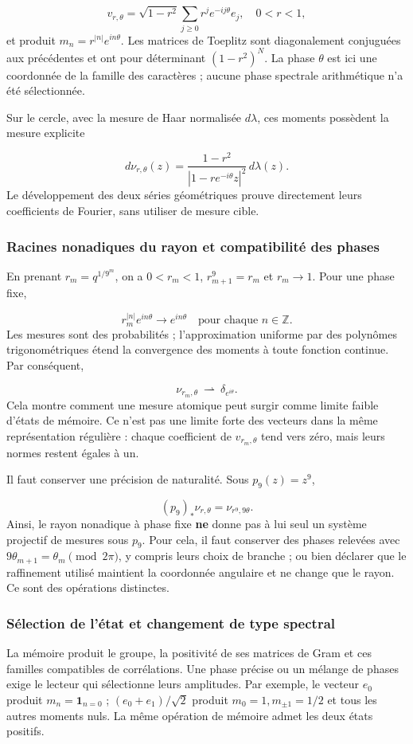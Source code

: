 \[
v_{r,\theta}=\sqrt{1-r^2}\sum_{j\ge0}r^j e^{-ij\theta}e_j,
\quad 0<r<1,
\]
et produit \(m_n=r^{|n|}e^{in\theta}\). Les matrices de Toeplitz sont diagonalement conjuguées aux précédentes et ont pour déterminant \((1-r^2)^N\). La phase \(\theta\) est ici une coordonnée de la famille des caractères ; aucune phase spectrale arithmétique n'a été sélectionnée.

Sur le cercle, avec la mesure de Haar normalisée \(d\lambda\), ces moments possèdent la mesure explicite

\[
d\nu_{r,\theta}(z)
=\frac{1-r^2}{|1-r e^{-i\theta}z|^2}\,d\lambda(z).
\]
Le développement des deux séries géométriques prouve directement leurs coefficients de Fourier, sans utiliser de mesure cible.


\subsubsection{Racines nonadiques du rayon et compatibilité des phases}
\label{viii:tm-add-m3-1}
En prenant \(r_m=q^{1/9^m}\), on a \(0<r_m<1\), \(r_{m+1}^{9}=r_m\) et \(r_m\to1\). Pour une phase fixe,

\[
r_m^{|n|}e^{in\theta}\longrightarrow e^{in\theta}
\quad\text{pour chaque }n\in\mathbb Z.
\]
Les mesures sont des probabilités ; l'approximation uniforme par des polynômes trigonométriques étend la convergence des moments à toute fonction continue. Par conséquent,

\[
\nu_{r_m,\theta}\ \rightharpoonup\ \delta_{e^{i\theta}}.
\]
Cela montre comment une mesure atomique peut surgir comme limite faible d'états de mémoire. Ce n'est pas une limite forte des vecteurs dans la même représentation régulière : chaque coefficient de \(v_{r_m,\theta}\) tend vers zéro, mais leurs normes restent égales à un.

Il faut conserver une précision de naturalité. Sous \(p_9(z)=z^9\),

\[
(p_9)_*\nu_{r,\theta}=\nu_{r^9,9\theta}.
\]
Ainsi, le rayon nonadique à phase fixe \textbf{ne} donne pas à lui seul un système projectif de mesures sous \(p_9\). Pour cela, il faut conserver des phases relevées avec \(9\theta_{m+1}=\theta_m\pmod{2\pi}\), y compris leurs choix de branche ; ou bien déclarer que le raffinement utilisé maintient la coordonnée angulaire et ne change que le rayon. Ce sont des opérations distinctes.


\subsubsection{Sélection de l'état et changement de type spectral}
\label{viii:tm-add-m3-2}
La mémoire produit le groupe, la positivité de ses matrices de Gram et ces familles compatibles de corrélations. Une phase précise ou un mélange de phases exige le lecteur qui sélectionne leurs amplitudes. Par exemple, le vecteur \(e_0\) produit \(m_n=\mathbf1_{n=0}\) ; \((e_0+e_1)/\sqrt2\) produit \(m_0=1,m_{\pm1}=1/2\) et tous les autres moments nuls. La même opération de mémoire admet les deux états positifs.

